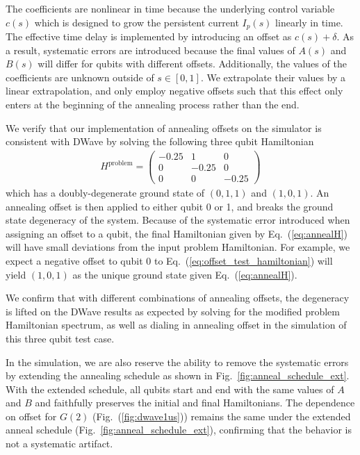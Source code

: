 \documentclass[prd,twocolumn,tightenlines,preprintnumbers,showpacs,superscriptaddress,notitlepage,nofootinbib,eqsecnum,floatfix,longbibliography,aps,10pt]{revtex4-2}
\begin{document}
The coefficients are nonlinear in time because the underlying control variable $c(s)$ which is designed to grow the persistent current $I_p(s)$ linearly in time.
The effective time delay is implemented by introducing an offset as $c(s) + \delta$.
As a result, systematic errors are introduced because the final values of $A(s)$ and $B(s)$ will differ for qubits with different offsets.
Additionally, the values of the coefficients are unknown outside of $s\in [0, 1]$.
We extrapolate their values by a linear extrapolation, and only employ negative offsets such that this effect only enters at the beginning of the annealing process rather than the end.

We verify that our implementation of annealing offsets on the simulator is consistent with DWave by solving the following three qubit Hamiltonian
\begin{align}
	\label{eq:offset_test_hamiltonian}
	H^{\textrm{problem}} =
	\begin{pmatrix}
		-0.25 & 1 & 0 \\
		0 & -0.25 & 0 \\
		0 & 0 & -0.25
	\end{pmatrix}
\end{align}
which has a doubly-degenerate ground state of $(0, 1, 1)$ and $(1, 0, 1)$. An annealing offset is then applied to either qubit 0 or 1, and breaks the ground state degeneracy of the system. Because of the systematic error introduced when assigning an offset to a qubit, the final Hamiltonian given by Eq.~(\ref{eq:annealH}) will have small deviations from the input problem Hamiltonian. For example, we expect a negative offset to qubit 0 to Eq.~(\ref{eq:offset_test_hamiltonian}) will yield $(1, 0, 1)$ as the unique ground state given Eq.~(\ref{eq:annealH}).

We confirm that with different combinations of annealing offsets, the degeneracy is lifted on the DWave results as expected by solving for the modified problem Hamiltonian spectrum, as well as dialing in annealing offset in the simulation of this three qubit test case.

In the simulation, we are also reserve the ability to remove the systematic errors by extending the annealing schedule as shown in Fig.~\ref{fig:anneal_schedule_ext}. With the extended schedule, all qubits start and end with the same values of $A$ and $B$ and faithfully preserves the initial and final Hamiltonians. The dependence on offset for $G(2)$ (Fig.~(\ref{fig:dwave1us})) remains the same under the extended anneal schedule (Fig.~\ref{fig:anneal_schedule_ext}), confirming that the behavior is not a systematic artifact.
\end{document}
